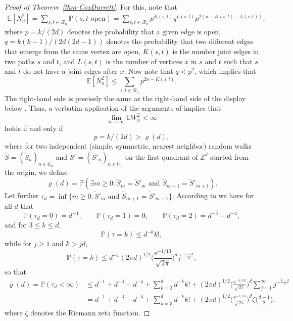 \documentclass[oneside]{amsart}
\newcommand{\e}{\mathrm e}
\newcommand{\N}{\mathbb{N}}
\theoremstyle{definition}
\renewcommand{\P}{\mathbb{P}}
\newcommand{\1}{\mathbbm{1}}
\newcommand{\E}{\mathbb{E}}
\newcommand{\0}{\mathbf{o}}
\newcommand{\Z}{\mathbb{Z}}
\numberwithin{equation}{section}
\begin{document}
\begin{proof}[Proof of Theorem~\ref{thm-CoxDurrett}]
For this, note that 
\begin{align*}
\E[N_n^2]=\sum_{s,t\in \mathcal R_n}\P(s,t\text{ open})=\sum_{s,t\in \mathcal R_n}p^{K(s,t)}q^{L(s,t)}p^{2(n-K(s,t)-L(s,t))},
\end{align*}
where $p=k/(2d)$ denotes the probability that a given edge is open, $q=k(k-1)/(2d(2d-1))$ denotes the probability that two different edges that emerge from the same vertex are open, $K(s,t)$ is the number joint edges in two paths $s$ and $t$, and $L(s,t)$ is the number of vertices $x$ in $s$ and $t$ such that $s$ and $t$ do not have a joint edges after $x$.  Now note that $q<p^2$, which implies that
\[ \E[N_n^2] \leq \sum_{s,t\in \mathcal R_n} p^{2n-K(s,t)}. \]
The right-hand side is precisely the same as the right-hand side of the display below \cite[Equation~(2$\cdot$7)]{CoxDurrett}. Thus, a verbatim application of the arguments of \cite[Section 2]{CoxDurrett} implies that 
\[ \lim_{n\to\infty} \E W_n^2 <\infty \]
holds if and only if 
\[ p =k/(2d)> \varrho(d), \]
where for two independent (simple, symmetric, nearest neighbor) random walks $\widetilde S=(\widetilde S_n)_{n\in\N_0}$ and $\widetilde S'=(\widetilde S'_n)_{n\in\N_0}$ on the first quadrant of $\Z^d$ started from the origin, we define
\[ \varrho(d) = \P(\exists m\geq 0 \colon \widetilde S_m = \widetilde S'_m \text{ and } \widetilde S_{m+1} = \widetilde S'_{m+1}). \]
Let further $\tau_d=\inf \{ m \geq 0 \colon \widetilde S'_m \text{ and } \widetilde S_{m+1} = \widetilde S'_{m+1} \}$.
According to \cite[p.~155]{CoxDurrett} we have for all $d$ that
\begin{equation}\label{firstfew} 
    \P(\tau_d=0)=d^{-1}, \qquad \P(\tau_d=1)=0, \qquad \P(\tau_d=2)=d^{-3}-d^{-4}, 
\end{equation}
and for $3 \leq k \leq d$,
\[ \P(\tau=k) \leq d^{-k} k!, \]
while for $j\geq 1$ and $k >jd$,
\begin{equation}\label{bigk} 
    \P(\tau=k) \leq d^{-1} (2\pi d)^{1/2} \Big( \frac{\e^{-1/13}}{\sqrt{2\pi}} \Big)^d j^{-\frac{1-d}{2}},
\end{equation}
so that
\begin{equation}\label{CDUB} 
    \begin{aligned} 
        \varrho(d)=\P(\tau_d<\infty) &\leq d^{-1} + d^{-3} -d^{-4} + \sum_{k=3}^d d^{-k} k! +  (2\pi d)^{1/2} \Big( \frac{\e^{-1/13}}{\sqrt{2\pi}} \Big)^d \sum_{j=1}^{\infty} j^{-\frac{1-d}{2}} \\ & = d^{-1} + d^{-3} -d^{-4} + \sum_{k=3}^d d^{-k} k! +  (2\pi d)^{1/2} \Big( \frac{\e^{-1/13}}{\sqrt{2\pi}} \Big)^d \zeta\Big( \frac{d-1}{2} \Big), 
\end{aligned}\end{equation}
where $\zeta$ denotes the Riemann zeta function.


\end{proof}
\end{document}
